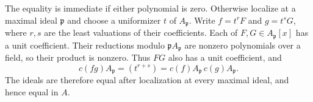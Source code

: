 The equality is immediate if either polynomial is zero. Otherwise localize at a maximal ideal $\mathfrak p$ and choose a uniformizer $t$ of $A_{\mathfrak p}$. Write $f=t^rF$ and $g=t^sG$, where $r,s$ are the least valuations of their coefficients. Each of $F,G\in A_{\mathfrak p}[x]$ has a unit coefficient. Their reductions modulo $\mathfrak pA_{\mathfrak p}$ are nonzero polynomials over a field, so their product is nonzero. Thus $FG$ also has a unit coefficient, and
\[c(fg)A_{\mathfrak p}=(t^{r+s})=c(f)A_{\mathfrak p}\,c(g)A_{\mathfrak p}.\]
The ideals are therefore equal after localization at every maximal ideal, and hence equal in $A$.
